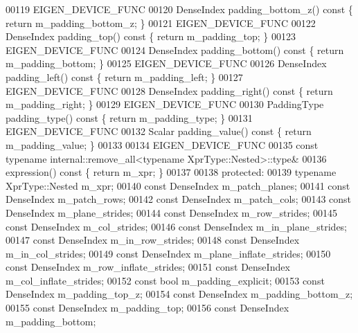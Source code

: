 \begin{DoxyCode}
00119     EIGEN\_DEVICE\_FUNC
00120     DenseIndex padding\_bottom\_z()\textcolor{keyword}{ const }\{ \textcolor{keywordflow}{return} m\_padding\_bottom\_z; \}
00121     EIGEN\_DEVICE\_FUNC
00122     DenseIndex padding\_top()\textcolor{keyword}{ const }\{ \textcolor{keywordflow}{return} m\_padding\_top; \}
00123     EIGEN\_DEVICE\_FUNC
00124     DenseIndex padding\_bottom()\textcolor{keyword}{ const }\{ \textcolor{keywordflow}{return} m\_padding\_bottom; \}
00125     EIGEN\_DEVICE\_FUNC
00126     DenseIndex padding\_left()\textcolor{keyword}{ const }\{ \textcolor{keywordflow}{return} m\_padding\_left; \}
00127     EIGEN\_DEVICE\_FUNC
00128     DenseIndex padding\_right()\textcolor{keyword}{ const }\{ \textcolor{keywordflow}{return} m\_padding\_right; \}
00129     EIGEN\_DEVICE\_FUNC
00130     PaddingType padding\_type()\textcolor{keyword}{ const }\{ \textcolor{keywordflow}{return} m\_padding\_type; \}
00131     EIGEN\_DEVICE\_FUNC
00132     Scalar padding\_value()\textcolor{keyword}{ const }\{ \textcolor{keywordflow}{return} m\_padding\_value; \}
00133 
00134     EIGEN\_DEVICE\_FUNC
00135     \textcolor{keyword}{const} \textcolor{keyword}{typename} internal::remove\_all<typename XprType::Nested>::type&
00136     expression()\textcolor{keyword}{ const }\{ \textcolor{keywordflow}{return} m\_xpr; \}
00137 
00138   \textcolor{keyword}{protected}:
00139     \textcolor{keyword}{typename} XprType::Nested m\_xpr;
00140     \textcolor{keyword}{const} DenseIndex m\_patch\_planes;
00141     \textcolor{keyword}{const} DenseIndex m\_patch\_rows;
00142     \textcolor{keyword}{const} DenseIndex m\_patch\_cols;
00143     \textcolor{keyword}{const} DenseIndex m\_plane\_strides;
00144     \textcolor{keyword}{const} DenseIndex m\_row\_strides;
00145     \textcolor{keyword}{const} DenseIndex m\_col\_strides;
00146     \textcolor{keyword}{const} DenseIndex m\_in\_plane\_strides;
00147     \textcolor{keyword}{const} DenseIndex m\_in\_row\_strides;
00148     \textcolor{keyword}{const} DenseIndex m\_in\_col\_strides;
00149     \textcolor{keyword}{const} DenseIndex m\_plane\_inflate\_strides;
00150     \textcolor{keyword}{const} DenseIndex m\_row\_inflate\_strides;
00151     \textcolor{keyword}{const} DenseIndex m\_col\_inflate\_strides;
00152     \textcolor{keyword}{const} \textcolor{keywordtype}{bool} m\_padding\_explicit;
00153     \textcolor{keyword}{const} DenseIndex m\_padding\_top\_z;
00154     \textcolor{keyword}{const} DenseIndex m\_padding\_bottom\_z;
00155     \textcolor{keyword}{const} DenseIndex m\_padding\_top;
00156     \textcolor{keyword}{const} DenseIndex m\_padding\_bottom;

\end{DoxyCode}
